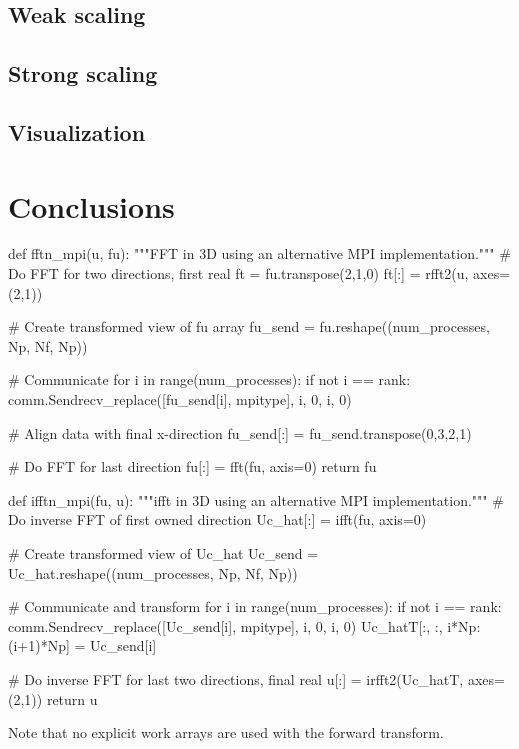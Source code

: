 \documentclass[11pt, oneside]{article}
\begin{document}
\subsection{Weak scaling}

\subsection{Strong scaling}

\subsection{Visualization}

\section{Conclusions}

\newpage
\appendix

\begin{python}
def fftn_mpi(u, fu):
    """FFT in 3D using an alternative MPI implementation."""
    # Do FFT for two directions, first real
    ft = fu.transpose(2,1,0)
    ft[:] = rfft2(u, axes=(2,1))

    # Create transformed view of fu array
    fu_send = fu.reshape((num_processes, Np, Nf, Np))

    # Communicate
    for i in range(num_processes):
        if not i == rank:
            comm.Sendrecv_replace([fu_send[i], mpitype], i, 0, i, 0)

    # Align data with final x-direction
    fu_send[:] = fu_send.transpose(0,3,2,1)

    # Do FFT for last direction
    fu[:] = fft(fu, axis=0)
    return fu

def ifftn_mpi(fu, u):
    """ifft in 3D using an alternative MPI implementation."""
    # Do inverse FFT of first owned direction
    Uc_hat[:] = ifft(fu, axis=0)

    # Create transformed view of Uc_hat
    Uc_send = Uc_hat.reshape((num_processes, Np, Nf, Np))

    # Communicate and transform
    for i in range(num_processes):
       if not i == rank:
           comm.Sendrecv_replace([Uc_send[i], mpitype], i, 0, i, 0)
       Uc_hatT[:, :, i*Np:(i+1)*Np] = Uc_send[i]

    # Do inverse FFT for last two directions, final real
    u[:] = irfft2(Uc_hatT, axes=(2,1))
    return u
\end{python}
Note that no explicit work arrays are used with the forward transform.


\end{document}
